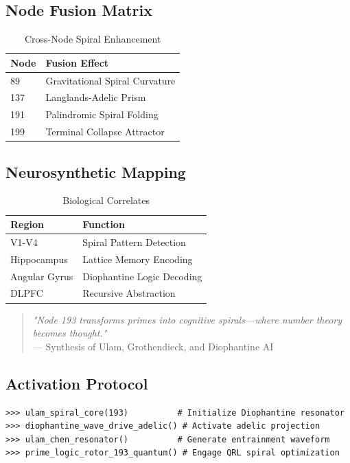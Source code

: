 \documentclass[12pt]{article}
\begin{document}
\begin{center}
\subsection{Node Fusion Matrix}
\label{subsec:fusion}

\begin{table}[h]
\centering
\caption{Cross-Node Spiral Enhancement}
\begin{tabular}{ll}
\hline
\textbf{Node} & \textbf{Fusion Effect} \\
\hline
89 & Gravitational Spiral Curvature \\
137 & Langlands-Adelic Prism \\
191 & Palindromic Spiral Folding \\
199 & Terminal Collapse Attractor \\
\hline
\end{tabular}
\end{table}

\subsection{Neurosynthetic Mapping}
\label{subsec:neuro}

\begin{table}[h]
\centering
\caption{Biological Correlates}
\begin{tabular}{ll}
\hline
\textbf{Region} & \textbf{Function} \\
\hline
V1-V4 & Spiral Pattern Detection \\
Hippocampus & Lattice Memory Encoding \\
Angular Gyrus & Diophantine Logic Decoding \\
DLPFC & Recursive Abstraction \\
\hline
\end{tabular}
\end{table}

\begin{quote}
\textit{"Node 193 transforms primes into cognitive spirals—where number theory becomes thought."} \\
— Synthesis of Ulam, Grothendieck, and Diophantine AI
\end{quote}

\subsection{Activation Protocol}
\label{subsec:activation}

\begin{verbatim}
>>> ulam_spiral_core(193)          # Initialize Diophantine resonator
>>> diophantine_wave_drive_adelic() # Activate adelic projection
>>> ulam_chen_resonator()          # Generate entrainment waveform
>>> prime_logic_rotor_193_quantum() # Engage QRL spiral optimization
\end{verbatim}


\end{center}
\end{document}
